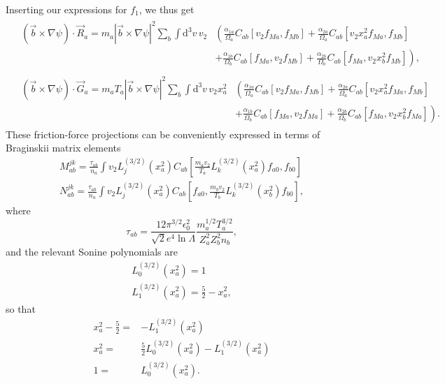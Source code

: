 \documentclass[12pt, a4paper]{article}
\renewcommand{\d}{\ensuremath{\mathrm{d}}}
\begin{document}
    Inserting our expressions for $f_{1}$, we thus get
    \begin{align}
      &\begin{aligned}
        (\vec{b} \times \nabla \psi) \cdot \vec{R}_a = m_a  |\vec{b} \times \nabla \psi|^2\sum_b \int \!\d^3 v \, v_2 &\left( \frac{\alpha_{1a}}{\Omega_a}  C_{ab}[v_2 f_{Ma},f_{Mb}] + \frac{\alpha_{2a}}{\Omega_a} C_{ab}[v_2 x_a^2 f_{Ma} ,f_{Mb}] \right.\\
          &\left.+ \frac{\alpha_{1b}}{\Omega_b}C_{ab}[f_{Ma},v_2 f_{Mb}] + \frac{\alpha_{2b}}{\Omega_b}C_{ab}[f_{Ma},v_2 x_b^2 f_{Mb} ]\right),
      \end{aligned}\\
      &\begin{aligned}
        (\vec{b} \times \nabla \psi) \cdot \vec{G}_a = m_a T_a |\vec{b} \times \nabla \psi|^2 \sum_b \int \!\d^3 v\, v_2 x_a^2  &\left( \frac{\alpha_{1a} }{\Omega_a}C_{ab}[v_2 f_{Ma},f_{Mb}]
          + \frac{\alpha_{2a}}{\Omega_a}C_{ab}[v_2 x_a^2 f_{Ma} ,f_{Mb}]
        \right.\\
        &\left.+ \frac{\alpha_{1b}}{\Omega_b}C_{ab}[f_{Ma},v_2 f_{Ma}]
          + \frac{\alpha_{2b}}{\Omega_b}C_{ab}[f_{Ma},v_2 x_b^2f_{Ma}] 
        \right).
      \end{aligned}
    \end{align}
    These friction-force projections can be conveniently expressed in terms of Braginskii matrix elements
    \begin{align}
  M_{ab}^{jk} = \frac{\tau_{ab}}{n_a} \int v_2 L_j^{(3/2)}(x_a^2) C_{ab}\left[\frac{m_a v_2}{T_a} L_k^{(3/2)}(x_a^2) f_{a0},f_{b0}\right] \\
  N_{ab}^{jk} = \frac{\tau_{ab}}{n_a} \int v_2 L_j^{(3/2)}(x_a^2) C_{ab}\left[f_{a0},\frac{m_b v_2}{T_b} L_k^{(3/2)}(x_b^2)  f_{b0}\right],
\end{align}
where
\begin{equation}
\tau_{ab} = \frac{12 \pi^{3/2} \epsilon_0^2}{\sqrt{2} e^4 \ln \Lambda} \frac{m_a^{1/2} T_a^{3/2}}{Z_a^2 Z_b^2 n_b},
\end{equation}
and the relevant Sonine polynomials are
\begin{align}
  L_0^{(3/2)}(x_a^2) = 1 \\
  L_1^{(3/2)}(x_a^2) = \frac{5}{2} - x_a^2,
\end{align}
so that
\begin{align}
  x_a^2 - \frac{5}{2} =& -L_1^{(3/2)}(x_a^2)  \label{eq:qmotiv}\\
  x_a^2  =& \frac{5}{2}L_0^{(3/2)}(x_a^2) -L_1^{(3/2)}(x_a^2)  \\
  1 = &L_0^{(3/2)}(x_a^2).
\end{align}
\end{document}
